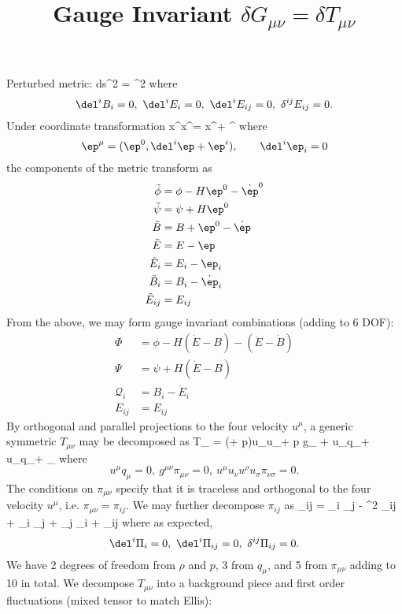 \documentclass[10pt,letterpaper]{article}
\title{Gauge Invariant $\delta G_{\mu\nu} = \delta T_{\mu\nu}$}
\author{}
\date{}
\begin{document}
\maketitle 
\noindent Perturbed metric:
\be
	ds^2 = \Omega^2 
\ee
where
\[
	\del^i B_i = 0,\ \del^i E_i = 0,\ \del^i E_{ij} = 0,\ \delta^{ij}E_{ij} = 0.
\]
Under coordinate transformation
\be
	x^\mu \to \tilde x^\mu = x^\mu + \ep^\mu
\ee
where 
\[
	\ep^\mu = (\ep^0, \del^i \ep + \ep^i),\qquad \del^i \ep_i = 0
\]
the components of the metric transform as
\begin{align}
	\tilde \phi &= \phi - H \ep^0 - \dot \ep^0\\
	\tilde \psi &= \psi + H \ep^0\\
	\tilde B &=B + \ep^0 - \dot \ep\\
	\tilde E &= E-\ep \\
	\tilde E_{i}&= E_i - \ep_i\\
	\tilde B_i &= B_i - \dot \ep_i\\
	\tilde E_{ij} &= E_{ij}
\end{align}
From the above, we may form gauge invariant combinations (adding to 6 DOF):
\begin{align}
	\Phi &= \phi - H(\dot E - B) - (\ddot E - \dot B)\\
	\Psi &= \psi + H(\dot E-B)\\
	\mathcal Q_i &= B_i - \dot E_i\\
	E_{ij} &= E_{ij}
\end{align}
By orthogonal and parallel projections to the four velocity $u^\mu$, a generic symmetric $T_{\mu\nu}$ may be decomposed as
\be
	T_{\mu\nu} = (\rho + p)u_\mu u_\nu + p g_{\mu\nu} + u_\nu q_\mu + u_\mu q_\nu + \pi_{\mu\nu}
\ee
where
\[
	u^\mu q_\mu = 0,\ g^{\mu\nu} \pi_{\mu\nu} = 0, \ u^\mu u_\nu u^\rho u_\sigma \pi_{\nu\sigma} = 0.
\]
The conditions on $\pi_{\mu\nu}$ specify that it is traceless and orthogonal to the four velocity $u^\mu$, i.e. $\pi_{\mu\nu} = \pi_{ij}$. We may further decompose $\pi_{ij}$ as
\be
	\pi_{ij} = \del_i \del_j \Pi -  \del^2 \Pi \delta_{ij} +  \del_i \Pi_j +  \del_j \Pi_i + \Pi_{ij}
\ee
where as expected,
\[
	\del^i \Pi_i = 0,\  \del^i\Pi_{ij} = 0,\ \delta^{ij}\Pi_{ij} = 0.
\]
We have 2 degrees of freedom from $\rho$ and $p$, 3 from $q_\mu$, and 5 from $\pi_{\mu\nu}$ adding to 10 in total. We decompose $T_{\mu\nu}$ into a background piece and first order fluctuations (mixed tensor to match Ellis):
\end{document}
